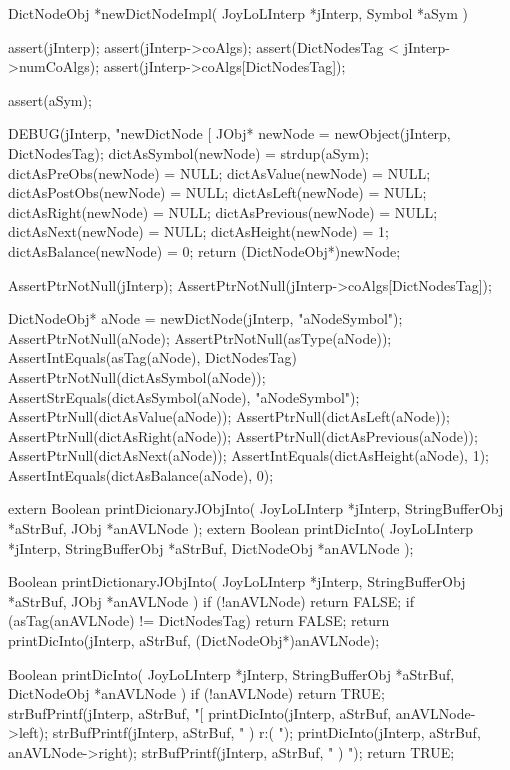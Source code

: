 DictNodeObj *newDictNodeImpl(
  JoyLoLInterp *jInterp,
  Symbol       *aSym
) {
  assert(jInterp);
  assert(jInterp->coAlgs);
  assert(DictNodesTag < jInterp->numCoAlgs);
  assert(jInterp->coAlgs[DictNodesTag]);
  
  assert(aSym);
  
  DEBUG(jInterp, "newDictNode [%
  JObj* newNode   = newObject(jInterp, DictNodesTag);
  dictAsSymbol(newNode)   = strdup(aSym);
  dictAsPreObs(newNode)   = NULL;
  dictAsValue(newNode)    = NULL;
  dictAsPostObs(newNode)  = NULL;
  dictAsLeft(newNode)     = NULL;
  dictAsRight(newNode)    = NULL;
  dictAsPrevious(newNode) = NULL;
  dictAsNext(newNode)     = NULL;
  dictAsHeight(newNode)   = 1;
  dictAsBalance(newNode)  = 0;
  return (DictNodeObj*)newNode;
}
\stopCCode


\startCTest
  AssertPtrNotNull(jInterp);
  AssertPtrNotNull(jInterp->coAlgs[DictNodesTag]);

  DictNodeObj* aNode = newDictNode(jInterp, "aNodeSymbol");
  AssertPtrNotNull(aNode);
  AssertPtrNotNull(asType(aNode));
  AssertIntEquals(asTag(aNode), DictNodesTag)
  AssertPtrNotNull(dictAsSymbol(aNode));
  AssertStrEquals(dictAsSymbol(aNode), "aNodeSymbol");
  AssertPtrNull(dictAsValue(aNode));
  AssertPtrNull(dictAsLeft(aNode));
  AssertPtrNull(dictAsRight(aNode));
  AssertPtrNull(dictAsPrevious(aNode));
  AssertPtrNull(dictAsNext(aNode));
  AssertIntEquals(dictAsHeight(aNode), 1);
  AssertIntEquals(dictAsBalance(aNode), 0);
\stopCTest
\stopTestCase
\stopTestSuite

\startCHeader
extern Boolean printDicionaryJObjInto(
  JoyLoLInterp    *jInterp,
  StringBufferObj *aStrBuf,
  JObj        *anAVLNode
);
extern Boolean printDicInto(
  JoyLoLInterp    *jInterp,
  StringBufferObj *aStrBuf,
  DictNodeObj         *anAVLNode
);
\stopCHeader
{}

\startCCode
Boolean printDictionaryJObjInto(
  JoyLoLInterp    *jInterp,
  StringBufferObj *aStrBuf,
  JObj        *anAVLNode
) {
  if (!anAVLNode) return FALSE;
  if (asTag(anAVLNode) != DictNodesTag) return FALSE;
  return printDicInto(jInterp, aStrBuf, (DictNodeObj*)anAVLNode);
}

Boolean printDicInto(
  JoyLoLInterp    *jInterp,
  StringBufferObj *aStrBuf,
  DictNodeObj         *anAVLNode
) {
  if (!anAVLNode) return TRUE;
  strBufPrintf(jInterp, aStrBuf, "[%
  printDicInto(jInterp, aStrBuf, anAVLNode->left);
  strBufPrintf(jInterp, aStrBuf, " ) r:( ");
  printDicInto(jInterp, aStrBuf, anAVLNode->right);
  strBufPrintf(jInterp, aStrBuf, " ) ");
  return TRUE;
}
\stopCCode

